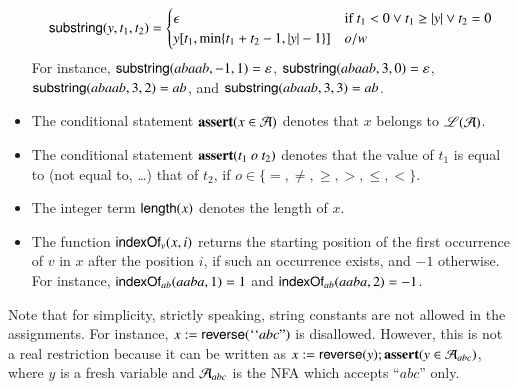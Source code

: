 \begin{itemize}
\[ \mathsf{substring}(y, t_1, t_2)=
\begin{cases}
\epsilon & \mbox{if }t_1<0\vee t_1 \ge |y| \vee t_2=0 \\
y[t_1, \min\{t_1+t_2-1, |y|-1\}] & o/w
\end{cases}
\]
For instance, $\mathsf{substring}(abaab, -1,1)=\varepsilon$, $\mathsf{substring}(abaab, 3,0)=\varepsilon$, $\mathsf{substring}(abaab, 3,2)=ab$, and $\mathsf{substring}(abaab, 3,3)=ab$.
%
\item The conditional statement $\textbf{assert}(x \in \mathcal{A})$ denotes that $x$ belongs to $\mathscr{L}(\mathcal{A})$.
%
\item The conditional statement $\textbf{assert}(t_1 \ o\ t_2)$ denotes that the value of $t_1$ is equal to (not equal to, \dots) that of $t_2$, if $o\in \{ =, \neq, \geq, >, \leq, < \}$.
%
\item The integer term $\mathsf{length}(x)$ denotes the length of $x$. 
%
\item The function $\mathsf{indexOf}_v(x, i)$ returns the starting position of the first occurrence of $v$ in $x$ after the position $i$, if such an occurrence exists, and $-1$ otherwise. For instance, $\mathsf{indexOf}_{ab}(aaba, 1) = 1$ and $\mathsf{indexOf}_{ab}(aaba, 2)=-1$.
\end{itemize}

\begin{remark}
Note that %
for simplicity, strictly speaking, string constants are not allowed in the assignments. %
For instance, %
$x:=\mathsf{reverse}({\mbox``}abc\mbox{''})$ is disallowed. However, this is not a real restriction because it can be written as $x:=\mathsf{reverse}(y); \textbf{assert}(y \in \mathcal{A}_{abc})$, where $y$ is a fresh variable and $\mathcal{A}_{abc}$ is the NFA which accepts ``$abc$''  only.
\end{remark}


